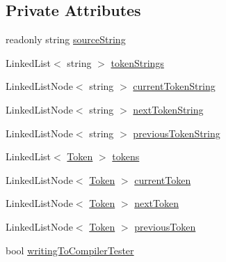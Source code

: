 \subsection*{Private Attributes}
\begin{DoxyCompactItemize}
\item 
readonly string \hyperlink{class_c_p_u___o_s___simulator_1_1_compiler_1_1_frontend_1_1_lexer_a735068e1008912edac69416bac78cef1}{source\+String}
\item 
Linked\+List$<$ string $>$ \hyperlink{class_c_p_u___o_s___simulator_1_1_compiler_1_1_frontend_1_1_lexer_ab99dc45a5bf56bba028a55213c81924f}{token\+Strings}
\item 
Linked\+List\+Node$<$ string $>$ \hyperlink{class_c_p_u___o_s___simulator_1_1_compiler_1_1_frontend_1_1_lexer_a38fd448afcdd31a212407189d8fcda8f}{current\+Token\+String}
\item 
Linked\+List\+Node$<$ string $>$ \hyperlink{class_c_p_u___o_s___simulator_1_1_compiler_1_1_frontend_1_1_lexer_a6795b61d4a157858e6471adb636a16f0}{next\+Token\+String}
\item 
Linked\+List\+Node$<$ string $>$ \hyperlink{class_c_p_u___o_s___simulator_1_1_compiler_1_1_frontend_1_1_lexer_a4cc9eaf6480960311bba7a18ccd99087}{previous\+Token\+String}
\item 
Linked\+List$<$ \hyperlink{class_c_p_u___o_s___simulator_1_1_compiler_1_1_frontend_1_1_tokens_1_1_token}{Token} $>$ \hyperlink{class_c_p_u___o_s___simulator_1_1_compiler_1_1_frontend_1_1_lexer_abf6ec407cb3e44e9da83d68a1b13ed4c}{tokens}
\item 
Linked\+List\+Node$<$ \hyperlink{class_c_p_u___o_s___simulator_1_1_compiler_1_1_frontend_1_1_tokens_1_1_token}{Token} $>$ \hyperlink{class_c_p_u___o_s___simulator_1_1_compiler_1_1_frontend_1_1_lexer_a030e4639542601955e162bd9010d4ed6}{current\+Token}
\item 
Linked\+List\+Node$<$ \hyperlink{class_c_p_u___o_s___simulator_1_1_compiler_1_1_frontend_1_1_tokens_1_1_token}{Token} $>$ \hyperlink{class_c_p_u___o_s___simulator_1_1_compiler_1_1_frontend_1_1_lexer_a9bdd0bc4e775f8708a1efebd0e84bc7c}{next\+Token}
\item 
Linked\+List\+Node$<$ \hyperlink{class_c_p_u___o_s___simulator_1_1_compiler_1_1_frontend_1_1_tokens_1_1_token}{Token} $>$ \hyperlink{class_c_p_u___o_s___simulator_1_1_compiler_1_1_frontend_1_1_lexer_ad64622c6372adff6559435fbfce44a2a}{previous\+Token}
\item 
bool \hyperlink{class_c_p_u___o_s___simulator_1_1_compiler_1_1_frontend_1_1_lexer_a8a75fa6d30d6d3b2ab713a729d85b081}{writing\+To\+Compiler\+Tester}

\end{DoxyCompactItemize}
